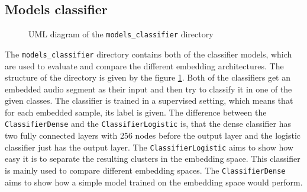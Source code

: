 \subsection{Models classifier}
\label{sub:Component-Models-Classifier}
\begin{figure}[htbp]
	\centering
	\caption{UML diagram of the \texttt{models\_classifier} directory}
	\label{fig:UML-Models-Classifier}
\end{figure}
\noindent
The \texttt{models\_classifier} directory contains both of the classifier models, which are used to evaluate and compare the different embedding architectures. The structure of the directory is given by the figure \ref{fig:UML-Models-Classifier}. Both of the classifiers get an embedded audio segment as their input and then try to classify it in one of the given classes. The classifier is trained in a supervised setting, which means that for each embedded sample, its label is given.
\newline
\newline
The difference between the \texttt{ClassifierDense} and the \texttt{ClassifierLogistic} is, that the dense classifier has two fully connected layers with 256 nodes before the output layer and the logistic classifier just has the output layer. The \texttt{ClassifierLogistic} aims to show how easy it is to separate the resulting clusters in the embedding space. This classifier is mainly used to compare different embedding spaces. The \texttt{ClassifierDense} aims to show how a simple model trained on the embedding space would perform.

